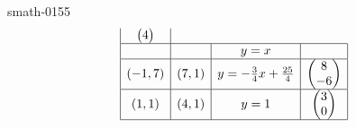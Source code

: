 \begin{corrige}{smath-0155}
\begin{equation*}
\begin{array}[]{|c|c|c|c|}
\begin{pmatrix}
                4    
            \end{pmatrix}\\
            \hline
            &&y=x&\\
            \hline
            (-1,7)&(7,1)&y=-\frac{ 3 }{ 4 }x+\frac{ 25 }{ 4 }&\begin{pmatrix}
                8    \\ 
                -6    
            \end{pmatrix}\\
            \hline
            (1,1)&(4,1)&y=1&\begin{pmatrix}
                3    \\ 
                0    
            \end{pmatrix}\\
            \hline
        \end{array}
    \end{equation*}

\end{corrige}
